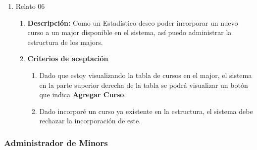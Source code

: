 \begin{enumerate}
\begin{enumerate}
\begin{enumerate}
				\end{enumerate}
		\end{enumerate}
	\item Relato 06
		\begin{enumerate}
			\item \textbf{Descripción:} Como un Estadístico deseo poder incorporar un nuevo curso a un major disponible en el sistema, así puedo administrar la estructura de los majors.
			\item \textbf{Criterios de aceptación}
				\begin{enumerate}
					\item Dado que estoy visualizando la tabla de cursos en el major, el sistema en la parte superior derecha de la tabla se podrá visualizar un botón que indica \textbf{Agregar Curso}.
					\item Dado incorporé un curso ya existente en la estructura, el sistema debe rechazar la incorporación de este.
				\end{enumerate}
		\end{enumerate}
\end{enumerate}

\subsubsection{Administrador de Minors}

